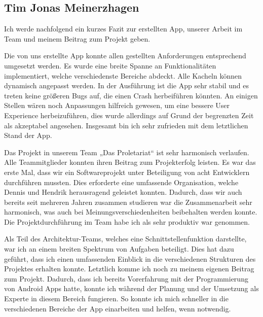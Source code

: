 \subsection{Tim Jonas Meinerzhagen}
Ich werde nachfolgend ein kurzes Fazit zur erstellten App, unserer Arbeit im Team und meinem Beitrag zum Projekt geben.

Die von uns erstellte App konnte allen gestellten Anforderungen entsprechend umgesetzt werden. Es wurde eine breite Spanne an Funktionalitäten implementiert, welche verschiedenste Bereiche abdeckt. Alle Kacheln können dynamisch angepasst werden. In der Ausführung ist die App sehr stabil und es treten keine größeren Bugs auf, die einen Crash herbeiführen könnten. An einigen Stellen wären noch Anpassungen hilfreich gewesen, um eine bessere User Experience herbeizuführen, dies wurde allerdings auf Grund der begrenzten Zeit als akzeptabel angesehen. Insgesamt bin ich sehr zufrieden mit dem letztlichen Stand der App.

Das Projekt in unserem Team „Das Proletariat“ ist sehr harmonisch verlaufen. Alle Teammitglieder konnten ihren Beitrag zum Projekterfolg leisten. Es war das erste Mal, dass wir ein Softwareprojekt unter Beteiligung von acht Entwicklern durchführen mussten. Dies erforderte eine umfassende Organisation, welche Dennis und Hendrik herausragend geleistet konnten. Dadurch, dass wir auch bereits seit mehreren Jahren zusammen studieren war die Zusammenarbeit sehr harmonisch, was auch bei Meinungsverschiedenheiten beibehalten werden konnte.  Die Projektdurchführung im Team habe ich als sehr produktiv war genommen.

Als Teil des Architektur-Teams, welches eine Schnittstellenfunktion darstellte, war ich an einem breiten Spektrum von Aufgaben beteiligt. Dies hat dazu geführt, dass ich einen umfassenden Einblick in die verschiedenen Strukturen des Projektes erhalten konnte. 
Letztlich komme ich noch zu meinem eigenen Beitrag zum Projekt. Dadurch, dass ich bereits Vorerfahrung mit der Programmierung von Android Apps hatte, konnte ich während der Planung und der Umsetzung als Experte in diesem Bereich fungieren. So konnte ich mich schneller in die verschiedenen Bereiche der App einarbeiten und helfen, wenn notwendig. 


